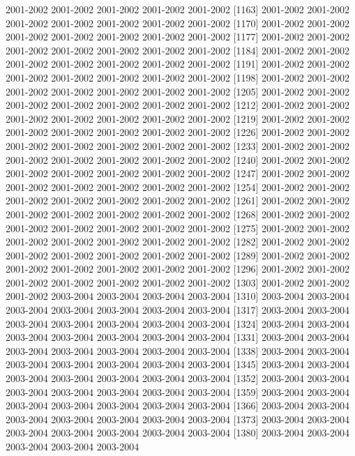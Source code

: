 \documentclass[
]{article}
\begin{document}
2001-2002 2001-2002 2001-2002 2001-2002 2001-2002 {[}1163{]} 2001-2002
2001-2002 2001-2002 2001-2002 2001-2002 2001-2002 2001-2002 {[}1170{]}
2001-2002 2001-2002 2001-2002 2001-2002 2001-2002 2001-2002 2001-2002
{[}1177{]} 2001-2002 2001-2002 2001-2002 2001-2002 2001-2002 2001-2002
2001-2002 {[}1184{]} 2001-2002 2001-2002 2001-2002 2001-2002 2001-2002
2001-2002 2001-2002 {[}1191{]} 2001-2002 2001-2002 2001-2002 2001-2002
2001-2002 2001-2002 2001-2002 {[}1198{]} 2001-2002 2001-2002 2001-2002
2001-2002 2001-2002 2001-2002 2001-2002 {[}1205{]} 2001-2002 2001-2002
2001-2002 2001-2002 2001-2002 2001-2002 2001-2002 {[}1212{]} 2001-2002
2001-2002 2001-2002 2001-2002 2001-2002 2001-2002 2001-2002 {[}1219{]}
2001-2002 2001-2002 2001-2002 2001-2002 2001-2002 2001-2002 2001-2002
{[}1226{]} 2001-2002 2001-2002 2001-2002 2001-2002 2001-2002 2001-2002
2001-2002 {[}1233{]} 2001-2002 2001-2002 2001-2002 2001-2002 2001-2002
2001-2002 2001-2002 {[}1240{]} 2001-2002 2001-2002 2001-2002 2001-2002
2001-2002 2001-2002 2001-2002 {[}1247{]} 2001-2002 2001-2002 2001-2002
2001-2002 2001-2002 2001-2002 2001-2002 {[}1254{]} 2001-2002 2001-2002
2001-2002 2001-2002 2001-2002 2001-2002 2001-2002 {[}1261{]} 2001-2002
2001-2002 2001-2002 2001-2002 2001-2002 2001-2002 2001-2002 {[}1268{]}
2001-2002 2001-2002 2001-2002 2001-2002 2001-2002 2001-2002 2001-2002
{[}1275{]} 2001-2002 2001-2002 2001-2002 2001-2002 2001-2002 2001-2002
2001-2002 {[}1282{]} 2001-2002 2001-2002 2001-2002 2001-2002 2001-2002
2001-2002 2001-2002 {[}1289{]} 2001-2002 2001-2002 2001-2002 2001-2002
2001-2002 2001-2002 2001-2002 {[}1296{]} 2001-2002 2001-2002 2001-2002
2001-2002 2001-2002 2001-2002 2001-2002 {[}1303{]} 2001-2002 2001-2002
2001-2002 2003-2004 2003-2004 2003-2004 2003-2004 {[}1310{]} 2003-2004
2003-2004 2003-2004 2003-2004 2003-2004 2003-2004 2003-2004 {[}1317{]}
2003-2004 2003-2004 2003-2004 2003-2004 2003-2004 2003-2004 2003-2004
{[}1324{]} 2003-2004 2003-2004 2003-2004 2003-2004 2003-2004 2003-2004
2003-2004 {[}1331{]} 2003-2004 2003-2004 2003-2004 2003-2004 2003-2004
2003-2004 2003-2004 {[}1338{]} 2003-2004 2003-2004 2003-2004 2003-2004
2003-2004 2003-2004 2003-2004 {[}1345{]} 2003-2004 2003-2004 2003-2004
2003-2004 2003-2004 2003-2004 2003-2004 {[}1352{]} 2003-2004 2003-2004
2003-2004 2003-2004 2003-2004 2003-2004 2003-2004 {[}1359{]} 2003-2004
2003-2004 2003-2004 2003-2004 2003-2004 2003-2004 2003-2004 {[}1366{]}
2003-2004 2003-2004 2003-2004 2003-2004 2003-2004 2003-2004 2003-2004
{[}1373{]} 2003-2004 2003-2004 2003-2004 2003-2004 2003-2004 2003-2004
2003-2004 {[}1380{]} 2003-2004 2003-2004 2003-2004 2003-2004 2003-2004
\end{document}
